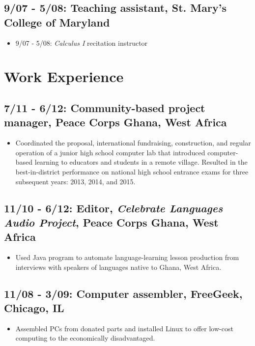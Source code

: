 \documentclass[11pt]{cv}
\begin{document}
\subsection*{9/07 - 5/08: Teaching assistant, St. Mary's College of Maryland}
\label{sec:orgheadline15}
\begin{itemize}
\item 9/07 - 5/08: \emph{Calculus I} recitation instructor\\
\end{itemize}
\section*{Work Experience}
\label{sec:orgheadline20}
\subsection*{7/11 - 6/12: Community-based project manager, Peace Corps Ghana, West Africa}
\label{sec:orgheadline17}
\begin{itemize}
\item Coordinated the proposal, international fundraising, construction, and regular operation of a junior high school computer lab that introduced computer-based learning to educators and students in a remote village. Resulted in the best-in-district performance on national high school entrance exams for three subsequent years: 2013, 2014, and 2015.\\
\end{itemize}
\subsection*{11/10 - 6/12: Editor, \emph{Celebrate Languages Audio Project}, Peace Corps Ghana, West Africa}
\label{sec:orgheadline18}
\begin{itemize}
\item Used Java program to automate language-learning lesson production from interviews with speakers of languages native to Ghana, West Africa.\\
\end{itemize}
\subsection*{11/08 - 3/09: Computer assembler, FreeGeek, Chicago, IL}
\label{sec:orgheadline19}
\begin{itemize}
\item Assembled PCs from donated parts and installed Linux to offer low-cost computing to the economically disadvantaged.\\
\end{itemize}
\end{document}
